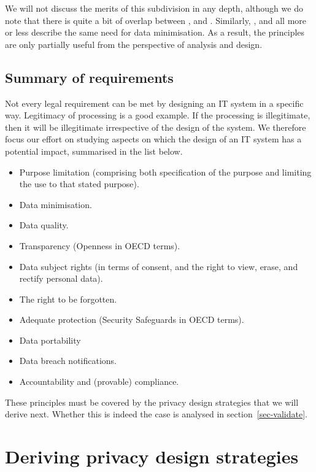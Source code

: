 We will not discuss the merits of this subdivision in any depth, although we do note that there is quite a bit of overlap between 
,  and . Similarly, ,  and  all more or less describe the same need for data minimisation. As a result, the principles are only partially useful from the perspective of analysis and design.

\subsection{Summary of requirements}
\label{ssec-sumreq}

Not every legal requirement can be met by designing an IT system in a specific way. Legitimacy of processing is a good example. If the processing is illegitimate, then it will be illegitimate irrespective of the design of the system. We therefore focus our effort on studying aspects on which the design of an IT system has a potential impact, summarised in the list below.
\begin{itemize}
\item Purpose limitation (comprising both specification of the purpose and limiting the use to that stated purpose).
\item Data minimisation.
\item Data quality.
\item Transparency (Openness in OECD terms).
\item Data subject rights (in terms of consent, and the right to view, erase, and rectify personal data).
\item The right to be forgotten.
\item Adequate protection (Security Safeguards in OECD terms).
\item Data portability
\item Data breach notifications.
\item Accountability and (provable) compliance.
\end{itemize}
These principles must be covered by the privacy design strategies that we will derive next. Whether this is indeed the case is analysed in section~\ref{sec-validate}.


\section{Deriving privacy design strategies}
\label{sec-determine}

